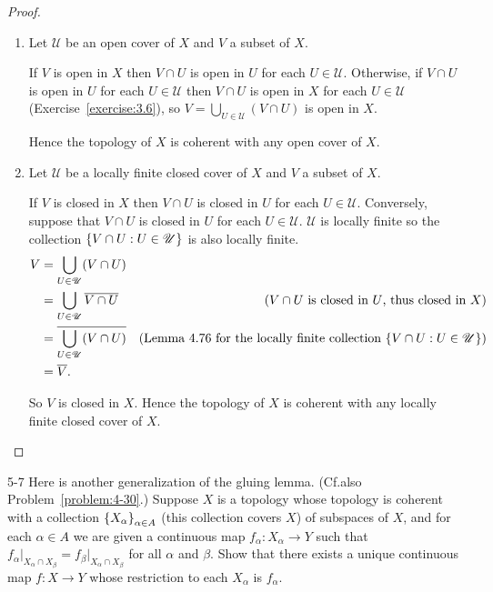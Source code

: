 \begin{proof}
	\begin{enumerate}[label={(\alph*)}]
		\item Let $\mathscr{U}$ be an open cover of $X$ and $V$ a subset of $X$.

		      If $V$ is open in $X$ then $V\cap U$ is open in $U$ for each $U\in\mathscr{U}$. Otherwise, if $V\cap U$ is open in $U$ for each $U\in\mathscr{U}$ then $V\cap U$ is open in $X$ for each $U\in\mathscr{U}$ (Exercise~\ref{exercise:3.6}), so $V = \bigcup_{U\in\mathscr{U}}(V\cap U)$ is open in $X$.

		      Hence the topology of $X$ is coherent with any open cover of $X$.
		\item Let $\mathscr{U}$ be a locally finite closed cover of $X$ and $V$ a subset of $X$.

		      If $V$ is closed in $X$ then $V\cap U$ is closed in $U$ for each $U\in\mathscr{U}$. Conversely, suppose that $V\cap U$ is closed in $U$ for each $U\in\mathscr{U}$. $\mathscr{U}$ is locally finite so the collection $\left\{{ V\cap U : U\in\mathscr{U} }\right\}$ is also locally finite.
		      \begin{align*}
			      V & = \bigcup_{U\in\mathscr{U}} (V\cap U)                                                                                                        \\
			        & = \bigcup_{U\in\mathscr{U}} \overline{V\cap U}   & \text{($V\cap U$ is closed in $U$, thus closed in $X$)}                                   \\
			        & = \overline{\bigcup_{U\in\mathscr{U}} (V\cap U)} & \text{(Lemma 4.76 for the locally finite collection $\left\{{ V\cap U : U\in\mathscr{U} }\right\}$)} \\
			        & = \overline{V}.
		      \end{align*}

		      So $V$ is closed in $X$. Hence the topology of $X$ is coherent with any locally finite closed cover of $X$.
	\end{enumerate}
\end{proof}

\begin{problem}{5-7}\label{problem:5-7}
Here is another generalization of the gluing lemma. (Cf.\@ also Problem~\ref{problem:4-30}.) Suppose $X$ is a topology whose topology is coherent with a collection $\left\{{X_{\alpha}}\right\}_{\alpha\in A}$ (this collection covers $X$) of subspaces of $X$, and for each $\alpha\in A$ we are given a continuous map $f_{\alpha}: X_{\alpha} \to Y$ such that $f_{\alpha}\vert_{X_{\alpha} \cap X_{\beta}} = f_{\beta}\vert_{X_{\alpha} \cap X_{\beta}}$ for all $\alpha$ and $\beta$. Show that there exists a unique continuous map $f: X \to Y$ whose restriction to each $X_{\alpha}$ is $f_{\alpha}$.
\end{problem}

